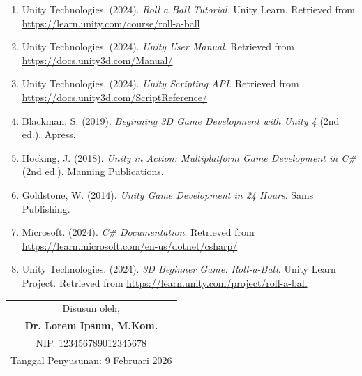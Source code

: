 \documentclass[12pt,a4paper]{article}
\begin{document}
\begin{enumerate}[leftmargin=*]
  \item Unity Technologies. (2024). \textit{Roll a Ball Tutorial}. Unity Learn. Retrieved from \url{https://learn.unity.com/course/roll-a-ball}
  
  \item Unity Technologies. (2024). \textit{Unity User Manual}. Retrieved from \url{https://docs.unity3d.com/Manual/}
  
  \item Unity Technologies. (2024). \textit{Unity Scripting API}. Retrieved from \url{https://docs.unity3d.com/ScriptReference/}
  
  \item Blackman, S. (2019). \textit{Beginning 3D Game Development with Unity 4} (2nd ed.). Apress.
  
  \item Hocking, J. (2018). \textit{Unity in Action: Multiplatform Game Development in C\#} (2nd ed.). Manning Publications.
  
  \item Goldstone, W. (2014). \textit{Unity Game Development in 24 Hours}. Sams Publishing.
  
  \item Microsoft. (2024). \textit{C\# Documentation}. Retrieved from \url{https://learn.microsoft.com/en-us/dotnet/csharp/}
  
  \item Unity Technologies. (2024). \textit{3D Beginner Game: Roll-a-Ball}. Unity Learn Project. Retrieved from \url{https://learn.unity.com/project/roll-a-ball}
\end{enumerate}

\vspace{1cm}

\begin{flushright}
\begin{tabular}{c}
Disusun oleh,\\[2cm]
\textbf{Dr. Lorem Ipsum, M.Kom.}\\
NIP. 123456789012345678\\
Tanggal Penyusunan: 9 Februari 2026
\end{tabular}
\end{flushright}
\end{document}
